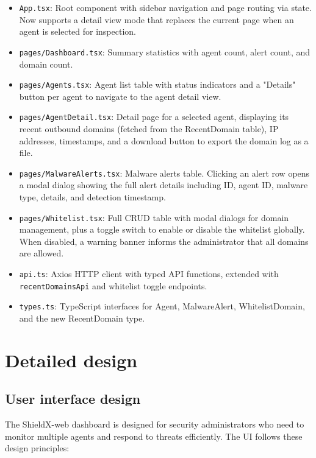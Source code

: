 \documentclass[../Main.tex]{subfiles}
\begin{document}
\begin{itemize}
    \item \texttt{App.tsx}: Root component with sidebar navigation and page routing via state. Now supports a detail view mode that replaces the current page when an agent is selected for inspection.
    \item \texttt{pages/Dashboard.tsx}: Summary statistics with agent count, alert count, and domain count.
    \item \texttt{pages/Agents.tsx}: Agent list table with status indicators and a "Details" button per agent to navigate to the agent detail view.
    \item \texttt{pages/AgentDetail.tsx}: Detail page for a selected agent, displaying its recent outbound domains (fetched from the RecentDomain table), IP addresses, timestamps, and a download button to export the domain log as a file.
    \item \texttt{pages/MalwareAlerts.tsx}: Malware alerts table. Clicking an alert row opens a modal dialog showing the full alert details including ID, agent ID, malware type, details, and detection timestamp.
    \item \texttt{pages/Whitelist.tsx}: Full CRUD table with modal dialogs for domain management, plus a toggle switch to enable or disable the whitelist globally. When disabled, a warning banner informs the administrator that all domains are allowed.
    \item \texttt{api.ts}: Axios HTTP client with typed API functions, extended with \texttt{recentDomainsApi} and whitelist toggle endpoints.
    \item \texttt{types.ts}: TypeScript interfaces for Agent, MalwareAlert, WhitelistDomain, and the new RecentDomain type.
\end{itemize}

\section{Detailed design}

\subsection{User interface design}
\label{section:4.2.1}

The ShieldX-web dashboard is designed for security administrators who need to monitor multiple agents and respond to threats efficiently. The UI follows these design principles:
\end{document}
